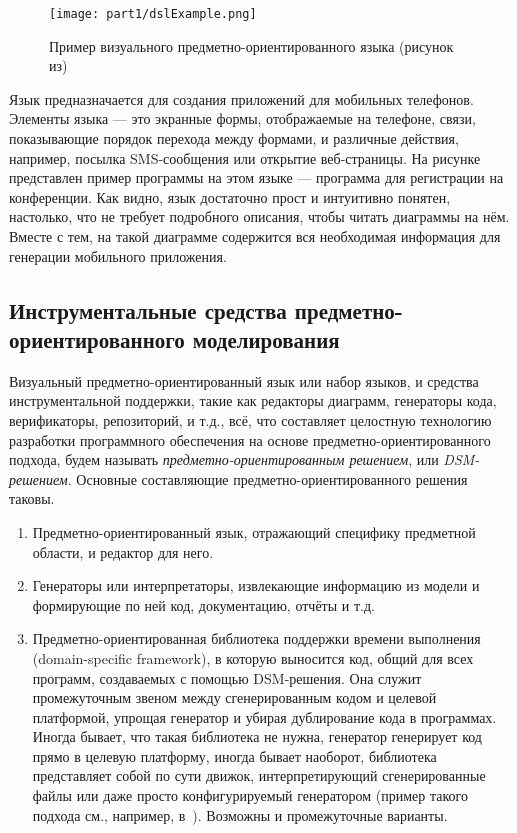 \begin{figure} [ht]
	\begin{center}
		\texttt{[image: part1/dslExample.png]}
		\caption{Пример визуального предметно-ориентированного языка (рисунок из\cite{kelly2008domain})}
		\label{dslExample}
	\end{center}
\end{figure}

Язык предназначается для создания приложений для мобильных телефонов. 
Элементы языка --- это экранные формы, отображаемые на телефоне, связи, 
показывающие порядок перехода между формами, и различные действия, например, 
посылка SMS-сообщения или открытие веб-страницы. На рисунке представлен пример 
программы на этом языке --- программа для регистрации на конференции. 
Как видно, язык достаточно прост и интуитивно понятен, настолько, что не требует 
подробного описания, чтобы читать диаграммы на нём. Вместе с тем, на такой 
диаграмме содержится вся необходимая информация для генерации мобильного 
приложения.

\subsection{Инструментальные средства предметно-ориентированного моделирования}
Визуальный предметно-ориентированный язык или набор языков, и средства 
инструментальной поддержки, такие как редакторы диаграмм, генераторы кода, 
верификаторы, репозиторий, и т.д., всё, что составляет целостную технологию 
разработки программного обеспечения на основе предметно-ориентированного 
подхода, будем называть \textit{предметно-ориентированным решением}, или \textit{DSM-решением}. 
Основные составляющие предметно-ориентированного решения таковы.

\begin{enumerate}
	\item Предметно-ориентированный язык, отражающий специфику предметной области, и редактор для него.
	\item Генераторы или интерпретаторы, извлекающие информацию из модели и формирующие по ней код, 
		документацию, отчёты и т.д.
	\item Предметно-ориентированная библиотека поддержки времени выполнения 
		(domain-specific framework), в которую выносится код, общий для всех 
		программ, создаваемых с помощью DSM-решения. Она служит промежуточным звеном 
		между сгенерированным кодом и целевой платформой, упрощая генератор и убирая 
		дублирование кода в программах. Иногда бывает, что такая библиотека не 
		нужна, генератор генерирует код прямо в целевую платформу, иногда бывает 
		наоборот, библиотека представляет собой по сути движок, интерпретирующий 
		сгенерированные файлы или даже просто конфигурируемый генератором (пример такого 
		подхода см., например, в~\cite{lyadova2010instruments}). Возможны и промежуточные варианты.
\end{enumerate}

